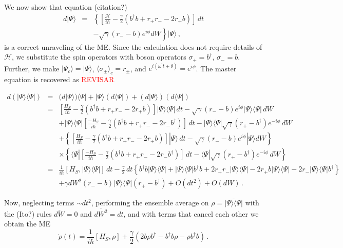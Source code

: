 \documentclass[twocolumn,aps,eqsecnum,showkeys,amsmath]{revtex4}
\begin{document}
We now show that equation (citation?)
%
\begin{eqnarray}
d|\Psi \rangle &=& \left\{ \left[ \frac{\mathcal{H}}{i\hbar} 
	- \frac{\gamma}{2}(b^\dag b +r_+r_- -2r_+b) \right] \,dt 
	\right. \nonumber \\
	&& \left.  - \sqrt{\gamma}(r_- -b)e^{i\phi} dW \right\} |\Psi \rangle  \,,
\end{eqnarray}
is a correct unraveling of the ME. Since the calculation does not require 
details of $\mathcal{H}$, we substitute the spin operators with boson 
operators $\sigma_+ =b^\dag, \, \sigma_- =b$. Further, we make 
$|\Psi_c\rangle =|\Psi \rangle$, $\langle \sigma_\pm \rangle_c =r_\pm$,
and $e^{i(\omega^\prime t +\theta)} =e^{i\phi}$. The master equation is 
recovered as \textcolor{red}{REVISAR}
%
\begin{widetext}
%
\begin{eqnarray*}
d(|\Psi\rangle \langle \Psi|) &=&
	(d|\Psi\rangle) \langle \Psi| +|\Psi\rangle (d\langle \Psi|) 
	+(d|\Psi\rangle) (d\langle \Psi|) 				\\
%
&=& \left[ \frac{H_S}{i\hbar} -\frac{\gamma}{2}(b^\dag b +r_+r_- -2r_+b) \right] 
	|\Psi \rangle \langle \Psi| \,dt  	
   -\sqrt{\gamma}(r_- -b)e^{i\phi} |\Psi \rangle\langle \Psi| \,dW \\
&& + |\Psi \rangle \langle \Psi| \left[ \frac{-H_S}{i\hbar} 
	-\frac{\gamma}{2}(b^\dag b +r_+r_- -2r_-b^\dag) \right] \,dt 
 -|\Psi \rangle\langle \Psi| \sqrt{\gamma}(r_+ -b^\dag)e^{-i\phi}\,dW \\
&&	+\left\{ \left[ \frac{H_S}{i\hbar} 
	-\frac{\gamma}{2}(b^\dag b +r_+r_- -2r_+b) \right] |\Psi \rangle \,dt 
	-\sqrt{\gamma}(r_- -b)e^{i\phi} |\Psi \rangle  dW	\right\}  \\
&&	\times \left\{ \langle \Psi| \left [\frac{-H_S}{i\hbar} 				
	-\frac{\gamma}{2}(b^\dag b +r_+r_- -2r_-b^\dag) \right] \,dt 
  -\langle\Psi| \sqrt{\gamma}(r_+ -b^\dag)e^{-i\phi} \,dW \right\} \\
%
&=& \frac{1}{i\hbar} \left[ H_S, |\Psi\rangle \langle \Psi| \right] \,dt 
	-\frac{\gamma}{2}\,dt \left\{  b^\dag b |\Psi\rangle \langle \Psi| 
	+|\Psi \rangle \langle \Psi| b^\dag b 
  +2r_+r_- |\Psi\rangle\langle\Psi| -2r_+b |\Psi\rangle\langle\Psi| 
	-2r_- |\Psi\rangle\langle\Psi| b^\dag \right\}		\\
&&	+\gamma dW^2 (r_- -b)|\Psi\rangle\langle\Psi|(r_+ -b^\dag)
	+O(dt^2) +O(dW) \,.
\end{eqnarray*}
\end{widetext}
Now, neglecting terms $\sim dt^2$, performing the ensemble average 
on $\rho= \overline{|\Psi\rangle\langle\Psi|}$ with the (Ito?) rules 
$\overline{dW}=0$ and $\overline{dW^2}=dt$, and with terms that 
cancel each other we obtain the ME 
%
\begin{equation} 	\label{ME-RF}
\dot{\rho}(t) = \frac{1}{i\hbar} [H_S, \rho] 
+\frac{\gamma}{2} ( 2b\rho b^\dag -b^\dag b \rho -\rho b^\dag b ) \,.		
\end{equation}
\end{document}
